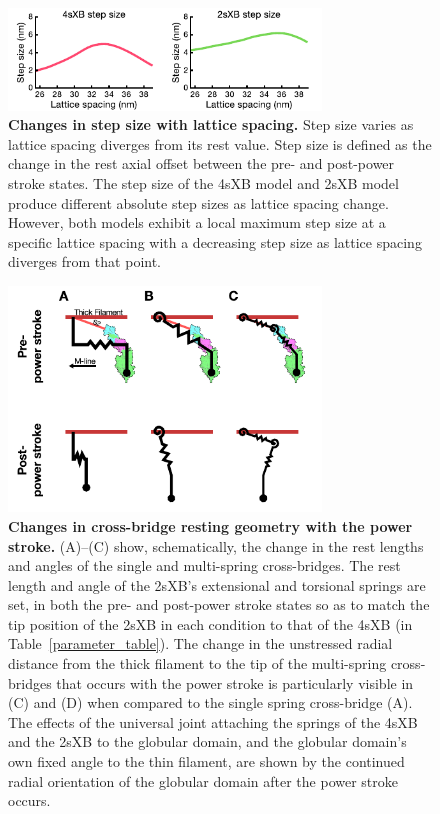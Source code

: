 \documentclass[10pt]{article}
\begin{document}
\begin{figure}[!ht]
    \begin{center}
    \includegraphics[width=8.3cm]{../imgs/fig_step_size.pdf}
    \caption{ \textbf{Changes in step size with lattice spacing.}
        Step size varies as lattice spacing diverges from its rest value.
        Step size is defined as the change in the rest axial offset between the pre- and post-power stroke states. 
        The step size of the 4sXB model and 2sXB model produce different absolute step sizes as lattice spacing change.
        However, both models exhibit a local maximum step size at a specific lattice spacing with a decreasing step size as lattice spacing diverges from that point.
        \label{fig_step_size}
           }
    \end{center}
\end{figure}

\begin{figure}[!ht]
    \begin{center}
    \includegraphics[width=8.3cm]{../imgs/fig_power_stroke_changes.pdf}
    \caption{ \textbf{Changes in cross-bridge resting geometry with the power stroke.}
        (A)--(C) show, schematically, the change in the rest lengths and angles of the single and multi-spring cross-bridges. 
        The rest length and angle of the 2sXB's extensional and torsional springs are set, in both the pre- and post-power stroke states so as to match the tip position of the 2sXB in each condition to that of the 4sXB (in Table~\ref{parameter_table}).
        The change in the unstressed radial distance from the thick filament to the tip of the multi-spring cross-bridges that occurs with the power stroke is particularly visible in (C) and (D) when compared to the single spring cross-bridge (A).
        The effects of the universal joint attaching the springs of the 4sXB and the 2sXB to the globular domain, and the globular domain's own fixed angle to the thin filament, are shown by the continued radial orientation of the globular domain after the power stroke occurs.
        \label{fig_power_stroke_changes}
           }
    \end{center}
\end{figure}
\end{document}
